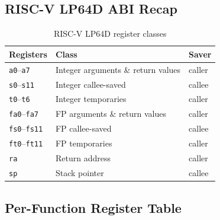 \documentclass[12pt,a4paper]{article}
\newcommand{\reg}[1]{\texttt{\color{reg}#1}}
\begin{document}
\subsection{RISC-V LP64D ABI Recap}

\begin{table}[H]
\centering
\caption{RISC-V LP64D register classes}
\begin{tabular}{lll}
\toprule
\textbf{Registers} & \textbf{Class} & \textbf{Saver} \\
\midrule
\reg{a0}--\reg{a7}   & Integer arguments \& return values & caller \\
\reg{s0}--\reg{s11}  & Integer callee-saved               & callee \\
\reg{t0}--\reg{t6}   & Integer temporaries                & caller \\
\reg{fa0}--\reg{fa7} & FP arguments \& return values      & caller \\
\reg{fs0}--\reg{fs11}& FP callee-saved                    & callee \\
\reg{ft0}--\reg{ft11}& FP temporaries                     & caller \\
\reg{ra}             & Return address                     & caller \\
\reg{sp}             & Stack pointer                      & callee \\
\bottomrule
\end{tabular}
\end{table}

\subsection{Per-Function Register Table}
\end{document}
